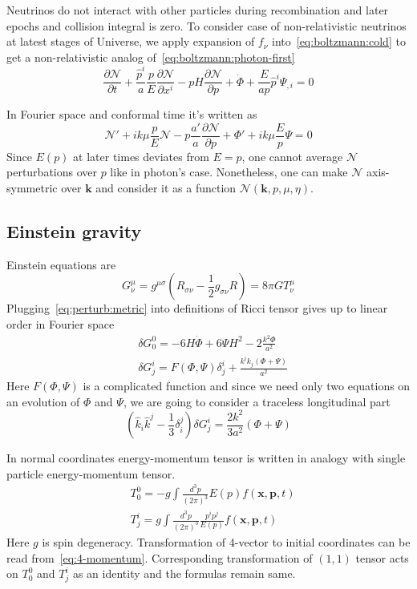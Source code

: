 \documentclass[12pt]{extarticle}
\numberwithin{problem}{section}
\numberwithin{theorem}{section}
\begin{document}
	Neutrinos do not interact with other particles during recombination and later epochs and collision integral is zero. To consider case of non-relativistic neutrinos at latest stages of Universe, we apply expansion of $f_\nu$ into~\ref{eq:boltzmann:cold} to get a non-relativistic analog of~\ref{eq:boltzmann:photon-first}
	\begin{equation}
		\frac{\partial\mathcal{N}}{\partial t} + \frac{\hat{p}^i}{a}\frac{p}{E}\frac{\partial\mathcal{N}}{\partial x^i} - pH\frac{\partial\mathcal{N}}{\partial p} + \dot{\Phi} + \frac{E}{ap}\hat{p}^i\Psi_{,i} = 0
	\end{equation}
	
	In Fourier space and conformal time it's written as
	\begin{equation}
		\mathcal{N}' + ik\mu\frac{p}{E}\mathcal{N} - p\frac{a'}{a}\frac{\partial\mathcal{N}}{\partial p} + \Phi' + ik\mu\frac{E}{p}\Psi = 0
	\end{equation}
	Since $E(p)$ at later times deviates from $E=p$, one cannot average $\mathcal{N}$ perturbations over $p$ like in photon's case. Nonetheless, one can make $\mathcal{N}$ axis-symmetric over $\mathbf{k}$ and consider it as a function $\mathcal{N}(\mathbf{k}, p, \mu, \eta)$.

	\subsection{Einstein gravity}
	Einstein equations are
	\begin{equation}
		G^\mu_\nu = g^{\mu\sigma}\left(R_{\sigma\nu} - \frac{1}{2}g_{\sigma\nu}R\right) = 8\pi GT^\mu_\nu
	\end{equation}
	Plugging~\ref{eq:perturb:metric} into definitions of Ricci tensor gives up to linear order in Fourier space
	\begin{align}
		& \delta G^0_0 = -6H\dot{\Phi} + 6\Psi H^2 - 2\frac{k^2\Phi}{a^2} \\
		& \delta G^i_j = F(\Phi, \Psi)\delta^i_j + \frac{k^ik_j(\Phi + \Psi)}{a^2}
	\end{align}
	Here $F(\Phi, \Psi)$ is a complicated function and since we need only two equations on an evolution of $\Phi$ and $\Psi$, we are going to consider a traceless longitudinal part
	\begin{equation}
		(\hat{k}_i\hat{k}^j - \frac{1}{3}\delta_i^j)\delta G^i_j = \frac{2k^2}{3a^2}(\Phi + \Psi)
	\end{equation}
	
	In normal coordinates energy-momentum tensor is written in analogy with single particle energy-momentum tensor.
	\begin{align}
		& T^0_0 = -g\int \frac{d^3p}{(2\pi)^3} E(p) f(\mathbf{x}, \mathbf{p}, t) \\
		& T^i_j = g\int \frac{d^3p}{(2\pi)^3} \frac{p^ip^j}{E(p)} f(\mathbf{x}, \mathbf{p}, t)
	\end{align}
	Here $g$ is spin degeneracy. Transformation of 4-vector to initial coordinates can be read from~\ref{eq:4-momentum}. Corresponding transformation of $(1, 1)$ tensor acts on $T^0_0$ and $T^i_j$ as an identity and the formulas remain same.
	
\end{document}
